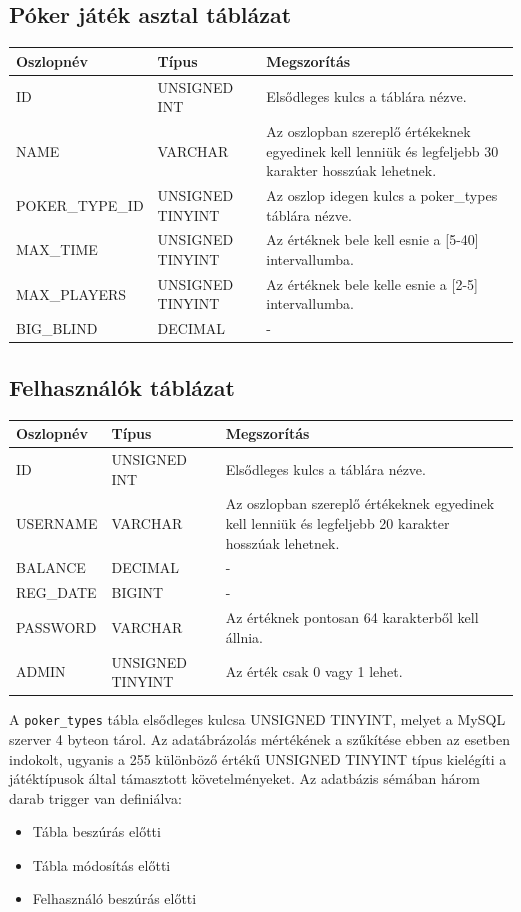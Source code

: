 \subsection{Póker játék asztal táblázat}
\begin{tabular}{| C{3.8cm} | C{4.2cm} | C{6.1cm} |}
\hline
 \textbf{Oszlopnév} & \textbf{Típus} & \textbf{Megszorítás} \\ \hline
  ID & UNSIGNED INT & Elsődleges kulcs a táblára nézve. \\ \hline
  NAME & VARCHAR & Az oszlopban szereplő értékeknek egyedinek kell lenniük és legfeljebb 30 karakter hosszúak lehetnek.  \\ \hline
  POKER\_TYPE\_ID & UNSIGNED TINYINT & Az oszlop idegen kulcs a poker\_types táblára nézve. \\ \hline
  MAX\_TIME & UNSIGNED TINYINT & Az értéknek bele kell esnie a [5-40] intervallumba. \\ \hline
  MAX\_PLAYERS & UNSIGNED TINYINT & Az értéknek bele kelle esnie a [2-5] intervallumba. \\ \hline
  BIG\_BLIND & DECIMAL & - \\ \hline
\end{tabular}

\subsection{Felhasználók táblázat}
\begin{tabular}{| C{3.8cm} | C{4.2cm} | C{6.1cm} |}
\hline
 \textbf{Oszlopnév} & \textbf{Típus} & \textbf{Megszorítás} \\ \hline
  ID & UNSIGNED INT & Elsődleges kulcs a táblára nézve. \\ \hline
  USERNAME & VARCHAR & Az oszlopban szereplő értékeknek egyedinek kell lenniük és legfeljebb 20 karakter hosszúak lehetnek.  \\ \hline
  BALANCE & DECIMAL & - \\ \hline
  REG\_DATE & BIGINT & - \\ \hline
  PASSWORD & VARCHAR & Az értéknek pontosan 64 karakterből kell állnia. \\ \hline
  ADMIN & UNSIGNED TINYINT & Az érték csak 0 vagy 1 lehet. \\ \hline
\end{tabular}

\hfill \break

A \texttt{poker\_types} tábla elsődleges kulcsa UNSIGNED TINYINT, melyet a MySQL szerver 4 byteon tárol. Az adatábrázolás mértékének a szűkítése ebben az esetben indokolt, ugyanis a 255 különböző értékű UNSIGNED TINYINT típus kielégíti a játéktípusok által támasztott követelményeket. Az adatbázis sémában három darab trigger van definiálva:
\begin{itemize}
\item Tábla beszúrás előtti
\item Tábla módosítás előtti
\item Felhasználó beszúrás előtti
\end{itemize}


